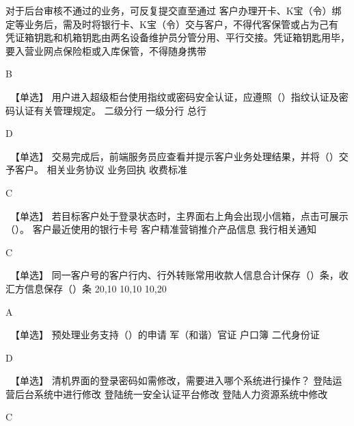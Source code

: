 \documentclass[kindlepaper]{BHCexam4kindle}
\begin{document}
\begin{questions}
 {  对于后台审核不通过的业务，可反复提交直至通过 } { 客户办理开卡、K宝（令）绑定等业务后，需及时将银行卡、K宝（令）交与客户，不得代客保管或占为己有 } { 凭证箱钥匙和机箱钥匙由两名设备维护员分管分用、平行交接。凭证箱钥匙用毕，要入营业网点保险柜或入库保管，不得随身携带 }
\begin{solution} B \end{solution}
\qs　【单选】 用户进入超级柜台使用指纹或密码安全认证，应遵照（）指纹认证及密码认证有关管理规定。 \xx
{} {  二级分行 } { 一级分行 } { 总行 }
\begin{solution} D \end{solution}
\qs　【单选】 交易完成后，前端服务员应查看并提示客户业务处理结果，并将（）交予客户。 \xx
{} {  相关业务协议 } { 业务回执 } { 收费标准 }
\begin{solution} C \end{solution}
\qs　【单选】 若目标客户处于登录状态时，主界面右上角会出现小信箱，点击可展示（）。 \xx
{} {  客户最近使用的银行卡号 } { 客户精准营销推介产品信息 } { 我行相关通知 }
\begin{solution} C \end{solution}
\qs　【单选】 同一客户号的客户行内、行外转账常用收款人信息合计保存（）条，收汇方信息保存（）条 \xx
{} {  20,10 } { 10,10 } { 10,20 }
\begin{solution} A \end{solution}
\qs　【单选】 预处理业务支持（）的申请 \xx
{} {  军（和谐）官证 } { 户口簿 } { 二代身份证 }
\begin{solution} D \end{solution}
\qs　【单选】 清机界面的登录密码如需修改，需要进入哪个系统进行操作？ \xx
{} {  登陆运营后台系统中进行修改 } { 登陆统一安全认证平台修改 } { 登陆人力资源系统中修改 }
\begin{solution} C \end{solution}

\end{questions}
\end{document}
